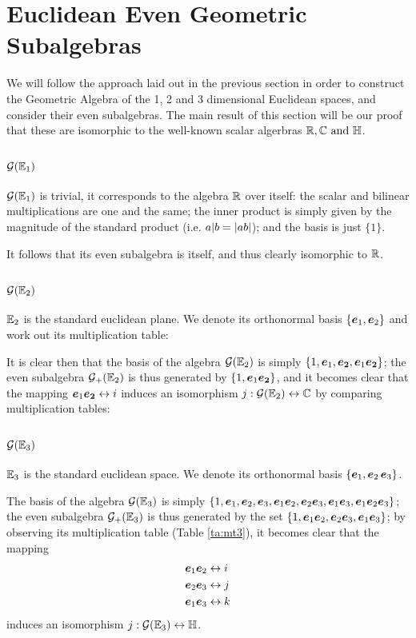 \section{Euclidean Even Geometric Subalgebras}

We will follow the approach laid out in the previous section in order to construct the Geometric Algebra of the 1, 2 and 3 dimensional Euclidean spaces, and consider their even subalgebras.
The main result of this section will be our proof that these are isomorphic to the well-known scalar algerbras $\R, \C \mathrm{\ and\ } \HM$.

\subsection{$\mathcal{G}(\mathbb{E}_1)$}

$\mathcal{G}(\mathbb{E}_1)$  is trivial, it corresponds to the algebra $\mathbb{R}$ over itself: the scalar and bilinear multiplications are one and the same; the inner product is simply given by the magnitude of the standard product (i.e. $a | b = \left|ab\right|$); and the basis is just $\{1\}$.

It follows that its even subalgebra is itself, and thus clearly isomorphic to $\mathbb{R}$.

\subsection{$\mathcal{G}(\mathbb{E}_2)$}

$\mathbb{E}_2$ is the standard euclidean plane. We denote its orthonormal basis $\{\boldsymbol{e}_1, \boldsymbol{e}_2\}$ and work out its multiplication table:


It is clear then that the basis of the algebra $\mathcal{G}(\mathbb{E}_2)$ is simply $\{1, \boldsymbol{e}_1, \boldsymbol{e_2}, \boldsymbol{e}_1\boldsymbol{e_2}\}$; the even subalgebra $\mathcal{G}_+(\mathbb{E}_2)$ is thus generated by $\{1, \boldsymbol{e}_1\boldsymbol{e_2} \}$, and it becomes clear that the mapping $\boldsymbol{e}_1\boldsymbol{e_2} \leftrightarrow i$ induces an isomorphism $j : \mathcal{G}(\mathbb{E}_2) \leftrightarrow \mathbb{C}$ by comparing multiplication tables:


\subsection{$\mathcal{G}(\mathbb{E}_3)$}
$\mathbb{E}_3$ is the standard euclidean space. We denote its orthonormal basis $\{\boldsymbol{e}_1, \boldsymbol{e}_2\, \boldsymbol{e}_3\}$.

The basis of the algebra $\mathcal{G}(\mathbb{E}_3)$ is simply $\{1, \boldsymbol{e}_1, \boldsymbol{e}_2, \boldsymbol{e}_3, \boldsymbol{e}_1\boldsymbol{e}_2, \boldsymbol{e}_2\boldsymbol{e}_3, \boldsymbol{e}_1\boldsymbol{e}_3, \boldsymbol{e}_1\boldsymbol{e}_2\boldsymbol{e}_3\}$; the even subalgebra $\mathcal{G}_+(\mathbb{E}_3)$ is thus generated by the set $\{1, \boldsymbol{e}_1\boldsymbol{e}_2, \boldsymbol{e}_2\boldsymbol{e}_3, \boldsymbol{e}_1\boldsymbol{e}_3\}$; by observing its multiplication table (Table \ref{ta:mt3}), it becomes clear that the mapping
\begin{align*}
	&\boldsymbol{e}_1\boldsymbol{e}_2 \leftrightarrow i \\
	&\boldsymbol{e}_2\boldsymbol{e}_3 \leftrightarrow j \\
	&\boldsymbol{e}_1\boldsymbol{e}_3 \leftrightarrow k 
\end{align*}
induces an isomorphism $j : \mathcal{G}(\mathbb{E}_3) \leftrightarrow \mathbb{H}$.

